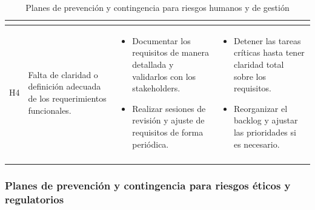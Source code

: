 \begin{longtable}{|>{\centering\arraybackslash}p{0.8cm}|>{\raggedright\arraybackslash}p{3.5cm}|>{\raggedright\arraybackslash}p{5.1cm}|>{\raggedright\arraybackslash}p{5.1cm}|}
\begin{itemize}
	\end{itemize} \\
	\hline
	H4 & Falta de claridad o definición adecuada de los requerimientos funcionales. &
	\begin{itemize}
		\item Documentar los requisitos de manera detallada y validarlos con los stakeholders.
		\item Realizar sesiones de revisión y ajuste de requisitos de forma periódica.
	\end{itemize} &
	\begin{itemize}
		\item Detener las tareas críticas hasta tener claridad total sobre los requisitos.
		\item Reorganizar el backlog y ajustar las prioridades si es necesario.
	\end{itemize} \\
	\hline
	\caption{Planes de prevención y contingencia para riesgos humanos y de gestión} 
	\label{tab:riesgos_humanos}
\end{longtable}

\subsubsection{Planes de prevención y contingencia para riesgos éticos y regulatorios}

\setlength{\tabcolsep}{4pt}
\renewcommand{\arraystretch}{1.2}

